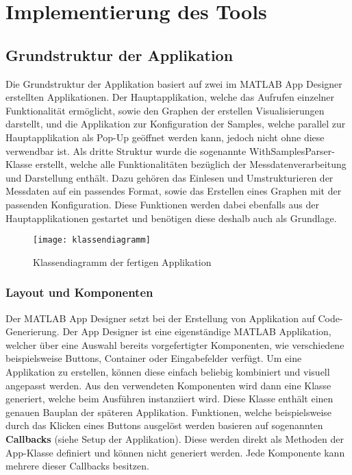 
\chapter{Implementierung des Tools}

\section{Grundstruktur der Applikation}

Die Grundstruktur der Applikation basiert auf zwei im MATLAB App Designer erstellten Applikationen. Der Hauptapplikation, welche das Aufrufen einzelner Funktionalität ermöglicht, sowie den Graphen der erstellen Visualisierungen darstellt, und die Applikation zur Konfiguration der Samples, welche parallel zur Hauptapplikation als Pop-Up geöffnet werden kann, jedoch nicht ohne diese verwendbar ist. Als dritte Struktur wurde die sogenannte WithSamplesParser-Klasse erstellt, welche alle Funktionalitäten bezüglich der Messdatenverarbeitung und Darstellung enthält. Dazu gehören das Einlesen und Umstrukturieren der Messdaten auf ein passendes Format, sowie das Erstellen eines Graphen mit der passenden Konfiguration. Diese Funktionen werden dabei ebenfalls aus der Hauptapplikationen gestartet und benötigen diese deshalb auch als Grundlage.

\begin{figure}[H]
	\centering
	\texttt{[image: klassendiagramm]}
	\caption{Klassendiagramm der fertigen Applikation}
	\label{fig:klassendiagramm}
\end{figure}

\subsection{Layout und Komponenten}

Der MATLAB App Designer setzt bei der Erstellung von Applikation auf Code-Generierung. Der App Designer ist eine eigenständige MATLAB Applikation, welcher über eine Auswahl bereits vorgefertigter Komponenten, wie verschiedene beispielsweise Buttons, Container oder Eingabefelder verfügt. Um eine Applikation zu erstellen, können diese einfach beliebig kombiniert und visuell angepasst werden. Aus den verwendeten Komponenten wird dann eine Klasse generiert, welche beim Ausführen instanziiert wird. Diese Klasse enthält einen genauen \glqq Bauplan\grqq{} der späteren Applikation. Funktionen, welche beispielsweise durch das Klicken eines Buttons ausgelöst werden basieren auf sogenannten \textbf{Callbacks} (siehe Setup der Applikation). Diese werden direkt als Methoden der App-Klasse definiert und können nicht generiert werden. Jede Komponente kann mehrere dieser Callbacks besitzen.

